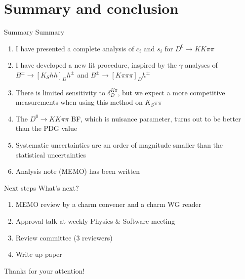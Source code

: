 \documentclass{beamer}
\begin{document}
\section{Summary and conclusion}
\begin{frame}{Summary}
  \vspace{0.0cm}
  {\Large{Summary}}
  \begin{enumerate}
    \setlength\itemsep{1.0em}
    \item{I have presented a complete analysis of $c_i$ and $s_i$ for $D^0\to KK\pi\pi$}
    \item{I have developed a new fit procedure, inspired by the $\gamma$ analyses of $B^\pm\to[K_Shh]_Dh^\pm$ and $B^\pm\to[K\pi\pi\pi]_Dh^\pm$}
    \item{There is limited sensitivity to $\delta_D^{K\pi}$, but we expect a more competitive measurements when using this method on $K_S\pi\pi$}
    \item{The $D^0\to KK\pi\pi$ BF, which is nuisance parameter, turns out to be better than the PDG value}
    \item{Systematic uncertainties are an order of magnitude smaller than the statistical uncertainties}
    \item{Analysis note (MEMO) has been written}
  \end{enumerate}
\end{frame}

\begin{frame}{Next steps}
  \vspace{0.0cm}
  {\Large{What's next?}}
  \vspace{0.2cm}
  \begin{enumerate}
    \setlength\itemsep{1.0em}
    \item{MEMO review by a charm convener and a charm WG reader}
    \item{Approval talk at weekly Physics \& Software meeting}
    \item{Review committee (3 reviewers)}
    \item{Write up paper}
  \end{enumerate}
  \vspace{1.0cm}
  \begin{center}
    {\huge Thanks for your attention!}
  \end{center}
\end{frame}
\end{document}
